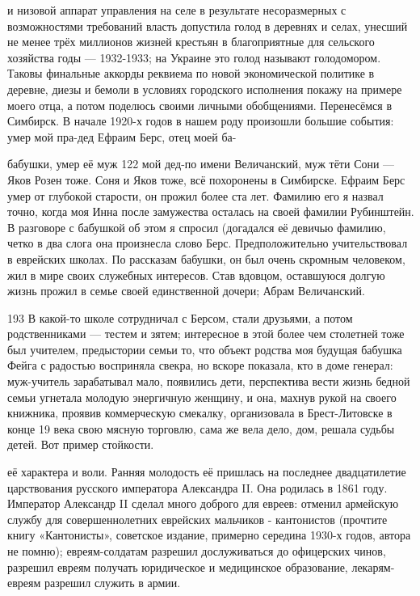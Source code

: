 и низовой аппарат управления на селе в результате несоразмерных с возможностями требований власть допустила голод в деревнях и селах, унесший не менее трёх миллионов жизней крестьян в благоприятные для сельского хозяйства годы — 1932-1933; на Украине это голод называют голодомором. Таковы финальные аккорды реквиема по новой экономической политике в деревне, диезы и бемоли в условиях городского исполнения покажу на примере моего отца, а потом поделюсь своими личными обобщениями. Перенесёмся в Симбирск. В начале 1920-х годов в нашем роду произошли большие события: умер мой пра-дед Ефраим Берс, отец моей ба-

бабушки, умер её муж 122 мой дед-по имени Величанский, муж тёти Сони — Яков Розен тоже. Соня и Яков тоже, всё похоронены в Симбирске. Ефраим Берс умер от глубокой старости, он прожил более ста лет. Фамилию его я назвал точно, когда моя Инна после замужества осталась на своей фамилии Рубинштейн. В разговоре с бабушкой об этом я спросил (догадался её девичью фамилию, четко в два слога она произнесла слово Берс. Предположительно учительствовал в еврейских школах. По рассказам бабушки, он был очень скромным человеком, жил в мире своих служебных интересов. Став вдовцом, оставшуюся долгую жизнь прожил в семье своей единственной дочери; Абрам Величанский.

193 В какой-то школе сотрудничал с Берсом, стали друзьями, а потом родственниками — тестем и зятем; интересное в этой более чем столетней тоже был учителем, предыстории семьи то, что объект родства моя будущая бабушка Фейга с радостью восприняла свекра, но вскоре показала, кто в доме генерал: муж-учитель зарабатывал мало, появились дети, перспектива вести жизнь бедной семьи угнетала молодую энергичную женщину, и она, махнув рукой на своего книжника, проявив коммерческую смекалку, организовала в Брест-Литовске в конце 19 века свою мясную торговлю, сама же вела дело, дом, решала судьбы детей. Вот пример стойкости.

её характера и воли. Ранняя молодость её пришлась на последнее двадцатилетие царствования русского императора Александра II. Она родилась в 1861 году. Император Александр II сделал много доброго для евреев: отменил армейскую службу для совершеннолетних еврейских мальчиков - кантонистов (прочтите книгу «Кантонисты», советское издание, примерно середина 1930-х годов, автора не помню); евреям-солдатам разрешил дослуживаться до офицерских чинов, разрешил евреям получать юридическое и медицинское образование, лекарям-евреям разрешил служить в армии.

